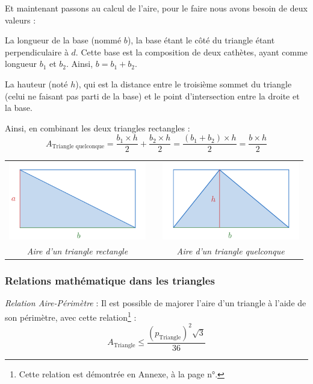 \documentclass[a4paper, twoside]{article}
\begin{document}
Et maintenant passons au calcul de l'aire,
pour le faire nous avons besoin de deux valeurs :

La longueur de la base (nommé $b$),
la base étant le côté du triangle étant perpendiculaire à $d$.
Cette base est la composition de deux cathètes, ayant comme longueur $b_1$ et $b_2$.
Ainsi, $b = b_1 + b_2$.

La hauteur (noté $h$),
qui est la distance entre le troisième sommet du triangle (celui ne faisant pas parti de la base) et le point d'intersection entre la droite et la base.

Ainsi, en combinant les deux triangles rectangles :
$$ A_{\text{Triangle quelconque}} = \frac{b_1 \times h}{2} + \frac{b_2 \times h}{2} = \frac{(b_1+b_2) \times h}{2} = \frac{b \times h}{2} $$

\begin{center}
	\begin{tabular}{ccc}
		\includegraphics[width=6cm]{Image/Aire triangle rectangle.png} &               & \includegraphics[width=6cm]{Image/Aire triangle quelconque.png} \\
		\textit{Aire d'un triangle rectangle}                          & \phantom{cou} & \textit{Aire d'un triangle quelconque}                          \\
	\end{tabular}
\end{center}

\subsubsection{Relations mathématique dans les triangles}

\emph{Relation Aire-Périmètre} : Il est possible de majorer l'aire d'un
triangle à l'aide de son périmètre, avec cette relation\footnote{
	Cette relation est démontrée en Annexe, à la page n°\pageref{relation_aire_perim_triangle}.
} :
$$ A_{\text{Triangle}} \leq \frac{(p_{\text{Triangle}})^2 \sqrt {3}} {36} $$
\end{document}
